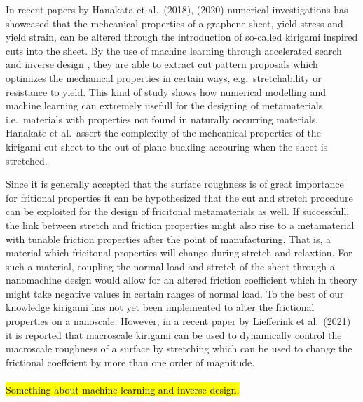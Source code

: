 In recent papers by Hanakata et al.\ \cite{PhysRevLett.121.255304}(2018),
\cite{PhysRevResearch.2.042006}(2020) numerical investigations has showcased
that the mehcanical properties of a graphene sheet, yield stress and yield
strain, can be altered through the introduction of so-called kirigami inspired
cuts into the sheet. By the use of machine learning through accelerated search
\cite{PhysRevLett.121.255304} and inverse design
\cite{PhysRevResearch.2.042006}, they are able to extract cut pattern proposals
which optimizes the mechanical properties in certain ways, e.g.\ stretchability
or resistance to yield. This kind of study shows how numerical modelling and
machine learning can extremely usefull for the designing of metamaterials, i.e.\
materials with properties not found in naturally occurring materials. Hanakate
et al.\ assert the complexity of the mehcanical properties of the kirigami cut
sheet to the out of plane buckling accouring when the sheet is stretched. 

Since it is generally accepted that the surface roughness is of great importance
for fritional properties it can be hypothesized that the cut and stretch
procedure can be exploited for the design of fricitonal metamaterials as well.
If successfull, the link between stretch and friction properties might also rise
to a metamaterial with tunable friction properties after the point of
manufacturing. That is, a material which fricitonal properties will change
during stretch and relaxtion. For such a material, coupling the normal load and
stretch of the sheet through a nanomachine design would allow for an altered
friction coefficient which in theory might take negative values in certain
ranges of normal load. To the best of our knowledge kirigami has not yet been
implemented to alter the frictional properties on a nanoscale. However, in a
recent paper by Liefferink et al.\ \cite{LIEFFERINK2021101475}(2021) it is
reported that macroscale kirigami can be used to dynamically control the macroscale roughness of a surface by stretching which can be used to change the frictional coeffcient by more than one order of magnitude.
\\
\\
\hl{Something about machine learning and inverse design.}







